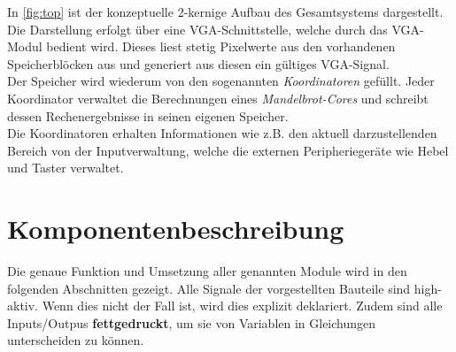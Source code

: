 \documentclass[a4paper,12pt,onesided]{report}
\begin{document}
In \autoref{fig:top} ist der konzeptuelle 2-kernige Aufbau des Gesamtsystems dargestellt.\\
Die Darstellung erfolgt über eine VGA-Schnittstelle, welche durch das VGA-Modul bedient wird.
Dieses liest stetig Pixelwerte aus den vorhandenen Speicherblöcken aus und generiert aus diesen ein gültiges VGA-Signal.\\
Der Speicher wird wiederum von den sogenannten \textit{Koordinatoren} gefüllt.
Jeder Koordinator verwaltet die Berechnungen eines \textit{Mandelbrot-Cores} und schreibt dessen Rechenergebnisse in seinen eigenen Speicher.\\
Die Koordinatoren erhalten Informationen wie z.B. den aktuell darzustellenden Bereich von der Inputverwaltung, welche die externen Peripheriegeräte wie Hebel und Taster verwaltet.\\

\section{Komponentenbeschreibung}
Die genaue Funktion und Umsetzung aller genannten Module wird in den folgenden Abschnitten gezeigt.
Alle Signale der vorgestellten Bauteile sind high-aktiv.
Wenn dies nicht der Fall ist, wird dies explizit deklariert.
Zudem sind alle Inputs/Outpus \textbf{fettgedruckt}, um sie von Variablen in Gleichungen unterscheiden zu können.
\end{document}
